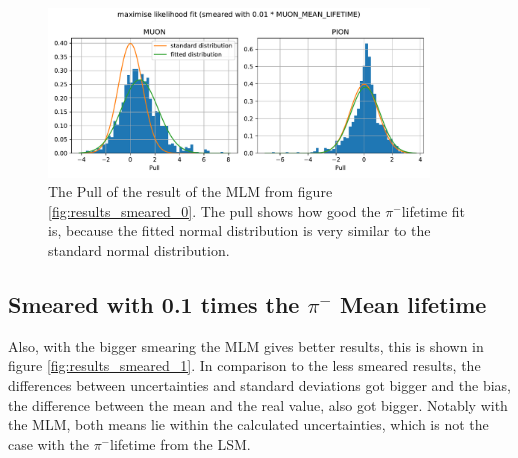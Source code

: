 \documentclass[11pt, a4paper, oneside]{book}
\newcommand\DoublePlotwidth{0.9}
\newcommand{\pion}{$\pi^{-}$}
\begin{document}
\begin{figure}[h]
    \centering
    \includegraphics[width=\DoublePlotwidth\textwidth]{images/4b_pull_0_likelihood.pdf}
    \caption{The Pull of the result of the MLM from figure \ref{fig:results_smeared_0}. The pull shows how good the \pion lifetime fit is, because the fitted normal distribution is very similar to the standard normal distribution.}
    \label{fig:smeared_pull_0}
\end{figure}

\FloatBarrier
\subsection{Smeared with 0.1 times the \texorpdfstring{\pion}{pion} Mean lifetime}

Also, with the bigger smearing the MLM gives better results, this is shown in figure \ref{fig:results_smeared_1}. In comparison to the less smeared results, the differences between uncertainties and standard deviations got bigger and the bias, the difference between the mean and the real value, also got bigger. Notably with the MLM, both means lie within the calculated uncertainties, which is not the case with the \pion lifetime from the LSM.
\end{document}
